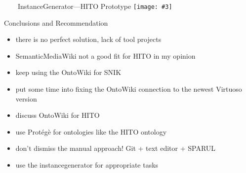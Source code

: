 \documentclass[aspectratio=1610]{beamer}
\newcommand{\imageslide}[4][]
{
\begin{frame}[plain]{~~~~#2}
\vspace{0.2em}
\centering\texttt{[image: \#3]}
\\#1
\note{#4}
\end{frame}
}
\begin{document}
\imageslide{InstanceGenerator---HITO Prototype}{img/instancegenerator.png}{}{}

\begin{frame}{Conclusions and Recommendation}
\begin{itemize}
\item there is no perfect solution, lack of tool projects
\item SemanticMediaWiki not a good fit for HITO in my opinion
\item keep using the OntoWiki for SNIK
\item put some time into fixing the OntoWiki connection to the newest Virtuoso version
\item discuss OntoWiki for HITO
\item use Prot\'eg\`e for ontologies like the HITO ontology
\item don't dismiss the manual approach! Git + text editor + SPARUL
\item use the instancegenerator for appropriate tasks
\end{itemize}
\end{frame}
\end{document}
